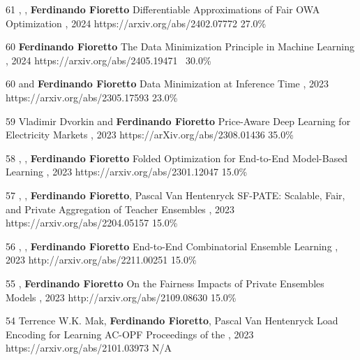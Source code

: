 \begin{pubs}
\confentry
	{61}
	{, , {\bf Ferdinando Fioretto}}
	{Differentiable Approximations of Fair OWA Optimization}
	{, 2024}
	{https://arxiv.org/abs/2402.07772}
	{27.0\%}

\confentry
	{60}
	{{\bf Ferdinando Fioretto}}
	{The Data Minimization Principle in Machine Learning}
	{, 2024}
	{https://arxiv.org/abs/2405.19471}
	{~30.0\%}


\confentry
	{60}
	{ and {\bf Ferdinando Fioretto}}
	{Data Minimization at Inference Time}
	{\procNeurIPS, 2023}
	{https://arxiv.org/abs/2305.17593}
	{23.0\%}

\confentry
	{59}
 	{Vladimir Dvorkin and {\bf Ferdinando Fioretto}}
  	{Price-Aware Deep Learning for Electricity Markets}
  	{, 2023}
  	{https://arXiv.org/abs/2308.01436}
  	{35.0\%}

\confentry 
	{58} %
	{, , {\bf Ferdinando Fioretto}}
	{Folded Optimization for End-to-End Model-Based Learning}
	{\procIJCAI, 2023}
	{https://arxiv.org/abs/2301.12047}
	{15.0\%}

\confentry
    {57} %
	{, , {\bf Ferdinando Fioretto}, Pascal Van Hentenryck}
	{SF-PATE: Scalable, Fair, and Private Aggregation of Teacher Ensembles}
    {\procIJCAI, 2023}
	{https://arxiv.org/abs/2204.05157}
    {15.0\%}

\confentry
    {56} %
	{, , {\bf Ferdinando Fioretto}}
	{End-to-End Combinatorial Ensemble Learning}
    {\procIJCAI, 2023}
	{http://arxiv.org/abs/2211.00251}
    {15.0\%}

\confentry
    {55} %
	{, {\bf Ferdinando Fioretto}}
	{On the Fairness Impacts of Private Ensembles Models}
    {\procIJCAI, 2023}
	{http://arxiv.org/abs/2109.08630}
    {15.0\%}

\confentry
	{54} %
	{Terrence W.K. Mak, {\bf Ferdinando Fioretto}, Pascal Van Hentenryck}
	{Load Encoding for Learning AC-OPF}
	{Proceedings of the , 2023}
	{https://arxiv.org/abs/2101.03973}
	{N/A}


\end{pubs}

